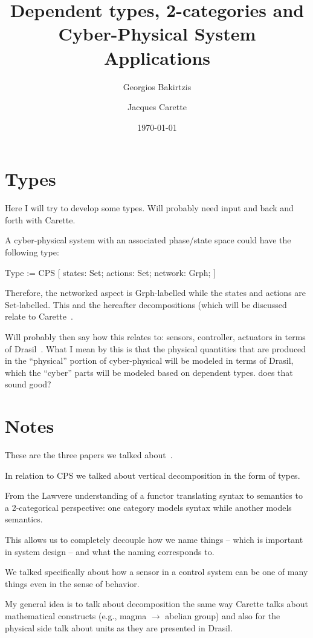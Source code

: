 \documentclass{article}
\title{Dependent types, 2-categories and Cyber-Physical System Applications}
\author{Georgios Bakirtzis \and Jacques Carette}
\date{\today}
\begin{document}
\maketitle

\section{Types}

{\color{text_gray} Here I will try
  to develop some types. Will probably need input and back
and forth with Carette.}

A cyber-physical system with an associated phase/state space could have the following type:

Type := CPS [
  states: Set;
  actions: Set;
  network: Grph;
]

Therefore, the networked aspect is Grph-labelled while the states and actions are Set-labelled. This and the hereafter decompositions (which will be discussed relate to Carette~\cite{carette:2012}.

Will probably then say how this relates to:
sensors, controller, actuators in terms of Drasil~\cite{szymcazk:2016}.
What I mean by this is that the physical quantities that are produced
in the ``physical'' portion of cyber-physical will be modeled in terms
of Drasil, which the ``cyber'' parts will be modeled based on dependent types.
{\color{text_gray} does that sound good?}


\section{Notes}
These are the three papers we talked about~\cite{szymczak:2016,carette:2012,smith:1999}.

In relation to CPS we talked about vertical decomposition
in the form of types.

From the Lawvere understanding
of a functor translating syntax to semantics
to a 2-categorical perspective:
one category models syntax while another models semantics.

This allows us to completely decouple how we name things -- which is important
in system design -- and what the naming corresponds to.

We talked specifically about how a sensor
in a control system can be one of many things even
in the sense of behavior.

My general idea is
to talk about decomposition the same way Carette talks about mathematical constructs
(e.g., magma $\rightarrow$ abelian group)
and also for the physical side talk about units as they are presented
in Drasil.
\end{document}

